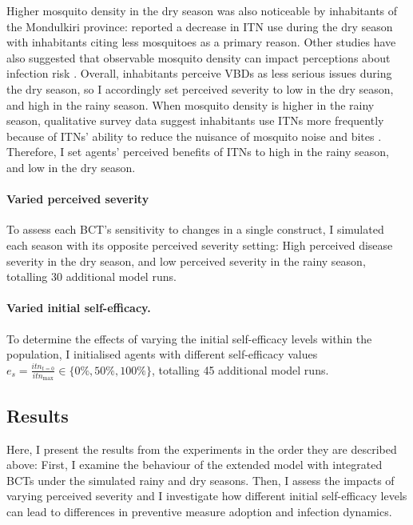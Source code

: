 Higher mosquito density in the dry season was also noticeable by inhabitants of the Mondulkiri province: \citet{phok_behavioural_2022} reported a decrease in ITN use during the dry season with inhabitants citing less mosquitoes as a primary reason. Other studies have also suggested that observable mosquito density can impact perceptions about infection risk \cite{raude_public_2012}. Overall, inhabitants perceive VBDs as less serious issues during the dry season, so I accordingly set perceived severity to low in the dry season, and high in the rainy season. When mosquito density is higher in the rainy season, qualitative survey data suggest inhabitants use ITNs more frequently because of ITNs' ability to reduce the nuisance of mosquito noise and bites \cite{roosa_general_2022}. Therefore, I set agents' perceived benefits of ITNs to high in the rainy season, and low in the dry season.

\paragraph{Varied perceived severity}To assess each BCT's sensitivity to changes in a single construct, I simulated each season with its opposite perceived severity setting: High perceived disease severity in the dry season, and low perceived severity in the rainy season, totalling 30 additional model runs.

\paragraph{Varied initial self-efficacy.}To determine the effects of varying the initial self-efficacy levels within the population, I initialised agents with different self-efficacy values $e_s=\frac{itn_{t=0}}{itn_{\max}}\in\{0\%,50\%,100\%\}$, totalling 45 additional model runs.

\clearpage
\subsection{Results}

Here, I present the results from the experiments in the order they are described above: First, I examine the behaviour of the extended model with integrated BCTs under the simulated rainy and dry seasons. Then, I assess the impacts of varying perceived severity and I investigate how different initial self-efficacy levels can lead to differences in preventive measure adoption and infection dynamics.

